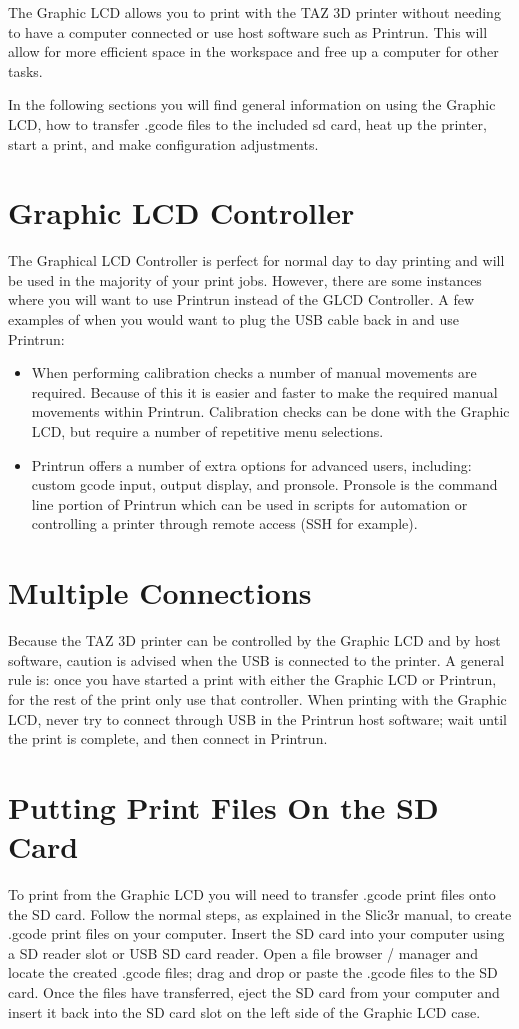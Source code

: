 
The Graphic LCD allows you to print with the TAZ 3D printer without needing to have a computer connected or use host software such as Printrun. This will allow for more efficient space in the workspace and free up a computer for other tasks.

In the following sections you will find general information on using the Graphic LCD, how to transfer .gcode files to the included sd card, heat up the printer, start a print, and make configuration adjustments.

\section{Graphic LCD Controller}
\label{sec:Graphic LCD Controller}
The Graphical LCD Controller is perfect for normal day to day printing and will be used in the majority of your print jobs. However, there are some instances where you will want to use Printrun instead of the GLCD Controller. A few examples of when you would want to plug the USB cable back in and use Printrun:
\begin{itemize}
	\item When performing calibration checks a number of manual movements are required. Because of this it is easier and faster to make the required manual movements within Printrun. Calibration checks can be done with the Graphic LCD, but require a number of repetitive menu selections.
	\item Printrun offers a number of extra options for advanced users, including: custom gcode input, output display, and pronsole. Pronsole is the command line portion of Printrun which can be used in scripts for automation or controlling a printer through remote access (SSH for example).
\end{itemize}

\section{Multiple Connections}
Because the TAZ 3D printer can be controlled by the Graphic LCD and by host software, caution is advised when the USB is connected to the printer. A general rule is: once you have started a print with either the Graphic LCD or Printrun, for the rest of the print only use that controller. When printing with the Graphic LCD, never try to connect through USB in the Printrun host software; wait until the print is complete, and then connect in Printrun.

\section{Putting Print Files On the SD Card}
To print from the Graphic LCD you will need to transfer .gcode print files onto the SD card. Follow the normal steps, as explained in the Slic3r manual, to create .gcode print files on your computer. Insert the SD card into your computer using a SD reader slot or USB SD card reader. Open a file browser / manager and locate the created .gcode files; drag and drop or paste the .gcode files to the SD card. Once the files have transferred, eject the SD card from your computer and insert it back into the SD card slot on the left side of the Graphic LCD case.

